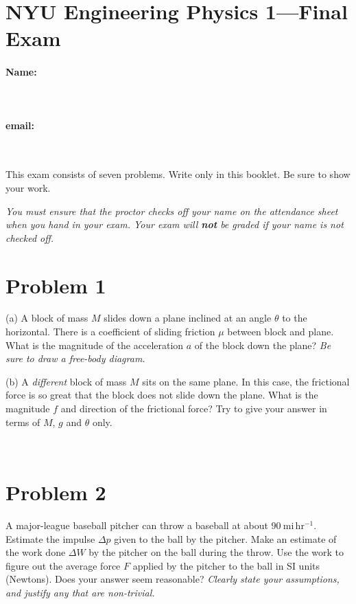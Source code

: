 \documentclass[12pt]{article}
\begin{document}
\setcounter{page}{0}
\thispagestyle{empty}

\section*{NYU Engineering Physics 1---Final Exam}

\vfill

\paragraph{Name:} ~

\paragraph{email:} ~

\vfill

This exam consists of seven problems.  Write only in this booklet.  Be
sure to show your work.

\vfill

\emph{You must ensure that the proctor checks off your name on the
attendance sheet when you hand in your exam.  Your exam will
\textbf{not} be graded if your name is not checked off.}

\clearpage

\section*{Problem 1}

(a) A block of mass $M$ slides down a plane inclined at an angle
$\theta$ to the horizontal.  There is a coefficient of sliding
friction $\mu$ between block and plane.  What is the magnitude of the
acceleration $a$ of the block down the plane?  \emph{Be sure to draw a
free-body diagram.}

\vfill

(b) A \emph{different} block of mass $M$ sits on the same plane.  In
this case, the frictional force is so great that the block does not
slide down the plane.  What is the magnitude $f$ and direction of the
frictional force?  Try to give your answer in terms of $M$, $g$ and
$\theta$ only.

\vfill ~

\clearpage

\section*{Problem 2}

A major-league baseball pitcher can throw a baseball at about
$90~\mathrm{mi\,hr^{-1}}$.  Estimate the impulse $\Delta p$ given to
the ball by the pitcher.  Make an estimate of the work done $\Delta W$
by the pitcher on the ball during the throw.  Use the work to figure
out the average force $F$ applied by the pitcher to the ball in SI
units (Newtons).  Does your answer seem reasonable?  \emph{Clearly
state your assumptions, and justify any that are non-trivial.}
\end{document}
